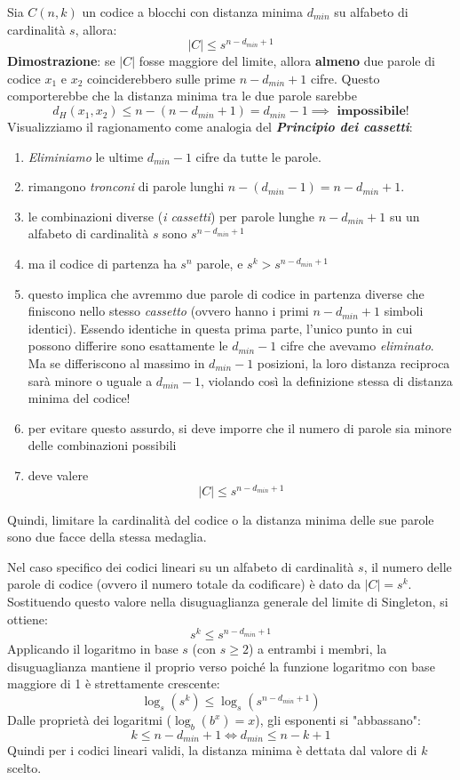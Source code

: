 Sia $C(n,k)$ un codice a blocchi con distanza minima $d_{min}$ su alfabeto di cardinalità $s$, allora:
\[|C|\leq s^{n-d_{min}+1}\]
\textbf{Dimostrazione}: se $|C|$ fosse maggiore del limite, allora \textbf{almeno} due parole di codice $x_1$ e $x_2$ coinciderebbero sulle prime $n-d_{min}+1 $ cifre. Questo comporterebbe che la distanza minima tra le due parole sarebbe
\[d_H(x_1,x_2) \leq n - (n-d_{min}+1) = d_{min}-1 \implies \textbf{ impossibile!}\]
Visualizziamo il ragionamento come analogia del \textit{\textbf{Principio dei cassetti}}:
\begin{enumerate}
    \item \textit{Eliminiamo} le ultime $d_{min} - 1$ cifre da tutte le parole.
    \item rimangono \textit{tronconi} di parole lunghi $n-(d_{min}-1)=n-d_{min}+1$.
    \item le combinazioni diverse (\textit{i cassetti}) per parole lunghe $n-d_{min}+1$ su un alfabeto di cardinalità $s$ sono $s^{n-d_{min}+1}$
    \item ma il codice di partenza ha $s^n$ parole, e $s^k > s^{n-d_{min}+1}$
    
\item questo implica che avremmo due parole di codice in partenza diverse che finiscono nello stesso \textit{cassetto} (ovvero hanno i primi $n-d_{min}+1$ simboli identici). Essendo identiche in questa prima parte, l'unico punto in cui possono differire sono esattamente le $d_{min}-1$ cifre che avevamo \textit{eliminato}. Ma se differiscono al massimo in $d_{min}-1$ posizioni, la loro distanza reciproca sarà minore o uguale a $d_{min}-1$, violando così la definizione stessa di distanza minima del codice!
    
    \item per evitare questo assurdo, si deve imporre che il numero di parole sia minore delle combinazioni possibili
    \item  deve valere $$ |C| \leq s^{n - d_{min} + 1} $$
    
\end{enumerate}


Quindi, limitare la cardinalità del codice o la distanza minima delle sue parole sono due facce della stessa medaglia.


Nel caso specifico dei codici lineari su un alfabeto di cardinalità $s$, il numero delle parole di codice (ovvero il numero totale da codificare) è dato da $|C| = s^k$. Sostituendo questo valore nella disuguaglianza generale del limite di Singleton, si ottiene:
\[ s^k \leq s^{n-d_{min}+1} \]
Applicando il logaritmo in base $s$ (con $s \ge 2$) a entrambi i membri, la disuguaglianza mantiene il proprio verso poiché la funzione logaritmo con base maggiore di 1 è strettamente crescente:
\[ \log_s(s^k) \leq \log_s(s^{n-d_{min}+1}) \]
Dalle proprietà dei logaritmi ($\log_b(b^x) = x$), gli esponenti si "abbassano":
\[ k \leq n - d_{min} + 1 \iff d_{min} \leq n - k + 1\]
Quindi per i codici lineari validi, la distanza minima è dettata dal valore di $k$ scelto.

